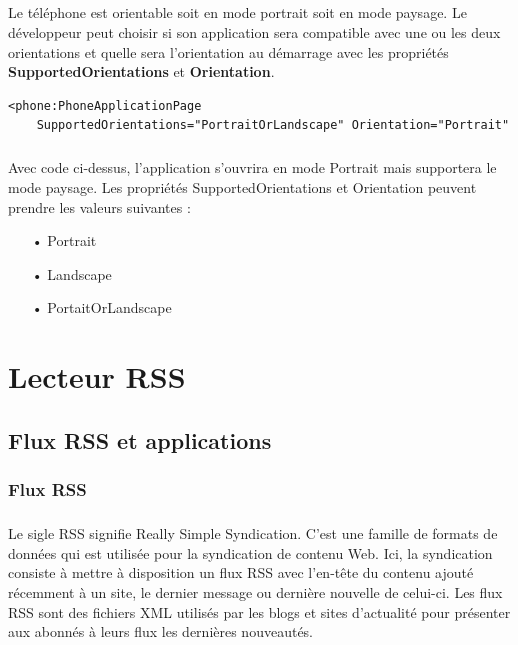 \documentclass[twoside,UTF8]{EPURapport}
\begin{document}
\paragraph{}
Le téléphone est orientable soit en mode portrait soit en mode paysage. Le développeur peut choisir si son application sera compatible avec une ou les deux orientations et quelle sera l'orientation au démarrage avec les propriétés \textbf{SupportedOrientations} et \textbf{Orientation}.

\begin{lstlisting}[caption={Orientation du téléphone}]
<phone:PhoneApplicationPage 
	SupportedOrientations="PortraitOrLandscape" Orientation="Portrait"
\end{lstlisting}

\paragraph{}
Avec code ci-dessus, l'application s'ouvrira en mode Portrait mais supportera le mode paysage. Les propriétés SupportedOrientations et Orientation peuvent prendre les valeurs suivantes : 
\begin{itemize}
	\item[•] Portrait
	\item[•] Landscape
	\item[•] PortaitOrLandscape
\end{itemize}
	
		

\chapter{Lecteur RSS}
	\section{Flux RSS et applications}
		\subsection{Flux RSS}
\paragraph{}		
Le sigle RSS signifie Really Simple Syndication. C'est une famille de formats de données qui est utilisée pour la syndication de contenu Web. Ici, la syndication consiste à mettre à disposition un flux RSS avec l'en-tête du contenu ajouté récemment à un site, le dernier message ou dernière nouvelle de celui-ci. Les flux RSS sont des fichiers XML utilisés par les blogs et sites d'actualité pour présenter aux abonnés à leurs flux les dernières nouveautés.
\end{document}
